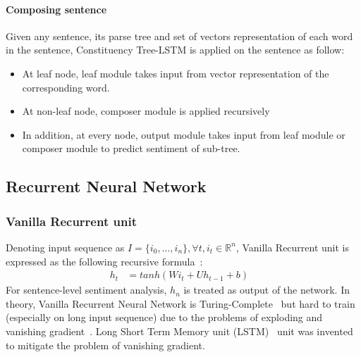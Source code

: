 \paragraph{Composing sentence}
Given any sentence, its parse tree and set of vectors representation of each word in the sentence, Constituency Tree-LSTM is applied on the sentence as follow:
\begin{itemize}
  \item At leaf node, leaf module takes input from vector representation of the corresponding word.
  \item At non-leaf node, composer module is applied recursively
  \item In addition, at every node, output module takes input from leaf module or composer module to predict sentiment of sub-tree.
\end{itemize}

\subsection{Recurrent Neural Network}
\subsubsection{Vanilla Recurrent unit}\label{sec:vanilla-rnn}
Denoting input sequence as \(I = \{i_0,\ldots,i_n\}, \forall t, i_t \in \mathbb{R}^n\), Vanilla Recurrent unit is expressed as the following recursive formula~\cite{treeLSTM}:
\begin{align}
h_t &= tanh(Wi_t + Uh_{t-1} + b)&
\end{align}
For sentence-level sentiment analysis, \(h_n\) is treated as output of the network.
In theory, Vanilla Recurrent Neural Network is Turing-Complete~\cite{rnn-turing-complete} but hard to train (especially on long input sequence) due to the problems of exploding and vanishing gradient~\cite{Bengio1994}.
Long Short Term Memory unit (LSTM)~\cite{originLSTM} unit was invented to mitigate the problem of vanishing gradient.
